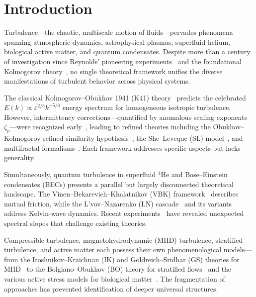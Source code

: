 \section{Introduction\label{sec:intro}}

Turbulence---the chaotic, multiscale motion of fluids---pervades phenomena spanning atmospheric dynamics, astrophysical plasmas, superfluid helium, biological active matter, and quantum condensates. Despite more than a century of investigation since Reynolds' pioneering experiments~\cite{reynolds1883xxi} and the foundational Kolmogorov theory~\cite{kolmogorov1941local}, no single theoretical framework unifies the diverse manifestations of turbulent behavior across physical systems.

The classical Kolmogorov--Obukhov 1941 (K41) theory~\cite{kolmogorov1941local} predicts the celebrated $E(k)\propto \varepsilon^{2/3}k^{-5/3}$ energy spectrum for homogeneous isotropic turbulence. However, intermittency corrections---quantified by anomalous scaling exponents $\zeta_p$---were recognized early~\cite{landau1944some,onsager1949statistical}, leading to refined theories including the Obukhov--Kolmogorov refined similarity hypothesis~\cite{kolmogorov1962refinement}, the She--Leveque (SL) model~\cite{she1994universal}, and multifractal formalisms~\cite{frisch1995turbulence}. Each framework addresses specific aspects but lacks generality.

Simultaneously, quantum turbulence in superfluid $^4$He and Bose--Einstein condensates (BECs) presents a parallel but largely disconnected theoretical landscape. The Vinen--Bekarevich--Khalatnikov (VBK) framework~\cite{vinen2002quantum} describes mutual friction, while the L'vov--Nazarenko (LN) cascade~\cite{lvov2001condensate} and its variants~\cite{nore2000kolmogorov} address Kelvin-wave dynamics. Recent experiments~\cite{minowa2011transition} have revealed unexpected spectral slopes that challenge existing theories.

Compressible turbulence, magnetohydrodynamic (MHD) turbulence, stratified turbulence, and active matter each possess their own phenomenological models---from the Iroshnikov--Kraichnan (IK) and Goldreich--Sridhar (GS) theories for MHD~\cite{iroshnikov1964turbulence,kraichnan1965inertial,goldreich1995toward} to the Bolgiano--Obukhov (BO) theory for stratified flows~\cite{bolgiano1959turbulent,obukhov1959influence} and the various active stress models for biological matter~\cite{ramaswamy2010hydrodynamics,markovich2021phenomenology}. The fragmentation of approaches has prevented identification of deeper universal structures.

